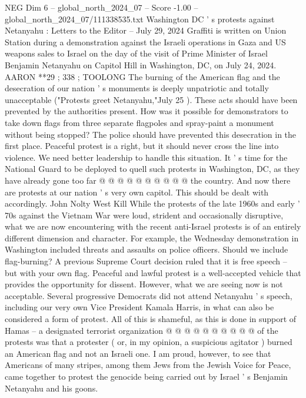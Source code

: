 \begin{textsample}{NEG Dim 6 – global\_north\_2024\_07 – Score -1.00 – global\_north\_2024\_07/111338535.txt}  \label{ex:f6_neg_219}
Washington DC ' s protests against Netanyahu : Letters to the Editor -- July 29, 2024 Graffiti is written on Union Station during a demonstration against the Israeli operations in Gaza and US weapons sales to Israel on the day of the visit of Prime Minister of Israel Benjamin Netanyahu on Capitol Hill in Washington, DC, on July 24, 2024.
AARON **29 ; 338 ; TOOLONG The burning of the American flag and the desecration of our nation ' s monuments is deeply unpatriotic and totally unacceptable ("Protests greet Netanyahu,"July 25 ).
These acts should have been prevented by the authorities present.
How was it possible for demonstrators to take down flags from three separate flagpoles and spray-paint a monument without being stopped?
The police should have prevented this desecration in the first place.
Peaceful protest is a right, but it should never cross the line into violence.
We need better leadership to handle this situation.
It ' s time for the National Guard to be deployed to quell such protests in Washington, DC, as they have already gone too far @ @ @ @ @ @ @ @ @ @ the country.
And now there are protests at our nation ' s very own capitol.
This should be dealt with accordingly.
John Nolty West Kill While the protests of the late 1960s and early ' 70s against the Vietnam War were loud, strident and occasionally disruptive, what we are now encountering with the recent anti-Israel protests is of an entirely different dimension and character.
For example, the Wednesday demonstration in Washington included threats and assaults on police officers.
Should we include flag-burning?
A previous Supreme Court decision ruled that it is free speech -- but with your own flag.
Peaceful and lawful protest is a well-accepted vehicle that provides the opportunity for dissent.
However, what we are seeing now is not acceptable.
Several progressive Democrats did not attend Netanyahu ' s speech, including our very own Vice President Kamala Harris, in what can also be considered a form of protest.
All of this is shameful, as this is done in support of Hamas -- a designated terrorist organization @ @ @ @ @ @ @ @ @ @ of the protests was that a protester ( or, in my opinion, a suspicious agitator ) burned an American flag and not an Israeli one.
I am proud, however, to see that Americans of many stripes, among them Jews from the Jewish Voice for Peace, came together to protest the genocide being carried out by Israel ' s Benjamin Netanyahu and his goons.

\end{textsample}
